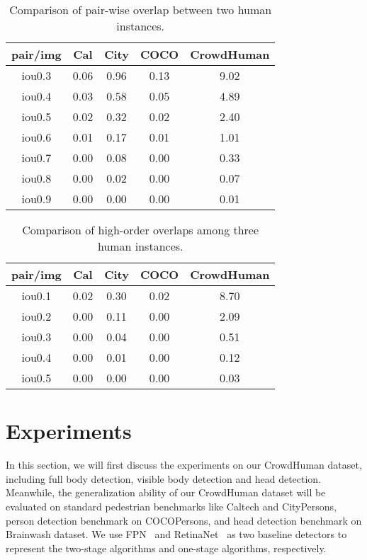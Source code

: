 \documentclass[10pt,twocolumn,letterpaper]{article}
\begin{document}
\begin{table}
\begin{center}
\begin{tabular}{c|cccc}
{pair/img} & {Cal} & {City} & {COCO} & {CrowdHuman} \\
\hline
{iou0.3} & {0.06} & {0.96} & {0.13} & {9.02} \\
{iou0.4} & {0.03} & {0.58} & {0.05} & {4.89} \\
{iou0.5} & {0.02} & {0.32} & {0.02} & {2.40} \\
{iou0.6} & {0.01} & {0.17} & {0.01} & {1.01} \\
{iou0.7} & {0.00} & {0.08} & {0.00} & {0.33} \\
{iou0.8} & {0.00} & {0.02} & {0.00} & {0.07} \\
{iou0.9} & {0.00} & {0.00} & {0.00} & {0.01} \\
\end{tabular}
\caption{Comparison of pair-wise overlap between two human instances.} \label{tab:PairOverlap}
\end{center}

\end{table}


\begin{table}
\begin{center}
\begin{tabular}{c|cccc}
{pair/img} & \multicolumn{1}{c}{Cal} & \multicolumn{1}{c}{City} & \multicolumn{1}{c}{COCO} & \multicolumn{1}{c}{CrowdHuman} \\
\hline
{iou0.1} & {0.02} & {0.30} & {0.02} & {8.70} \\
{iou0.2} & {0.00} & {0.11} & {0.00} & {2.09} \\
{iou0.3} & {0.00} & {0.04} & {0.00} & {0.51} \\
{iou0.4} & {0.00} & {0.01} & {0.00} & {0.12} \\
{iou0.5} & {0.00} & {0.00} & {0.00} & {0.03} \\
\end{tabular}
\end{center}
\caption{Comparison of high-order overlaps among three human instances.} \label{tab:highorderOverlap}
\end{table}

\section{Experiments}

In this section, we will first discuss the experiments on our CrowdHuman dataset, including full body detection, visible body detection and head detection. Meanwhile, the generalization ability of our CrowdHuman dataset will be evaluated on standard pedestrian benchmarks like Caltech and CityPersons, person detection benchmark on COCOPersons, and head detection benchmark on Brainwash dataset. We use FPN~\cite{lin2017feature} and RetinaNet~\cite{lin2017focal} as two baseline detectors to represent the two-stage algorithms and one-stage algorithms, respectively. 
\end{document}
